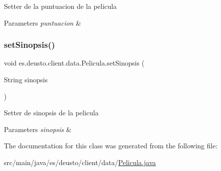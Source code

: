 Setter de la puntuacion de la pelicula 
\begin{DoxyParams}{Parameters}
{\em puntuacion} & \\
\hline
\end{DoxyParams}
\mbox{\label{classes_1_1deusto_1_1client_1_1data_1_1_pelicula_abaddc8274ccaa6f62f909d93e7cd99a9}} 
\subsubsection{\texorpdfstring{setSinopsis()}{setSinopsis()}}
{\footnotesize\ttfamily void es.\+deusto.\+client.\+data.\+Pelicula.\+set\+Sinopsis (\begin{DoxyParamCaption}\item[{String}]{sinopsis }\end{DoxyParamCaption})}

Setter de sinopsis de la pelicula 
\begin{DoxyParams}{Parameters}
{\em sinopsis} & \\
\hline
\end{DoxyParams}


The documentation for this class was generated from the following file\+:\begin{DoxyCompactItemize}
\item 
src/main/java/es/deusto/client/data/\mbox{\hyperlink{_pelicula_8java}{Pelicula.\+java}}\end{DoxyCompactItemize}
